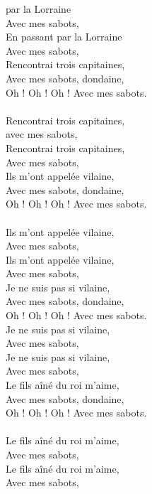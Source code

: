 
 par la Lorraine
\\Avec mes sabots,
\\En passant par la Lorraine
\\Avec mes sabots,
\\Rencontrai trois capitaines,
\\Avec mes sabots, dondaine,
\\Oh ! Oh ! Oh ! Avec mes sabots.
\\\\Rencontrai trois capitaines,
\\avec mes sabots,
\\Rencontrai trois capitaines,
\\Avec mes sabots,
\\Ils m'ont appelée vilaine,
\\Avec mes sabots, dondaine,
\\Oh ! Oh ! Oh ! Avec mes sabots.
\\\\Ils m'ont appelée vilaine,
\\Avec mes sabots,
\\Ils m'ont appelée vilaine,
\\Avec mes sabots,
\\Je ne suis pas si vilaine,
\\Avec mes sabots, dondaine,
\\Oh ! Oh ! Oh ! Avec mes sabots.
\\Je ne suis pas si vilaine,
\\Avec mes sabots,
\\Je ne suis pas si vilaine,
\\Avec mes sabots,
\\Le fils aîné du roi m'aime,
\\Avec mes sabots, dondaine,
\\Oh ! Oh ! Oh ! Avec mes sabots.
\\\\Le fils aîné du roi m'aime,
\\Avec mes sabots,
\\Le fils aîné du roi m'aime,
\\Avec mes sabots,
